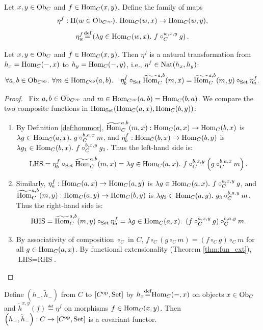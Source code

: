 \documentclass[10pt,a4paper]{article}
\renewcommand{\myprf}{\begin{proof}}
\renewcommand{\myqed}{\end{proof}}
\begin{document}
\begin{definition}
Let $x, y \in {\textrm{Ob}}_C$ and $f \in {\textrm{Hom}}_C(x,y)$. Define the family of maps
$$\eta^f : \Pi(w\in \Ob_{C^\op}).\ \Hom_C(w,x)\to \Hom_C(w,y),$$
$$\eta^f_w \eqdef \left(\lambda g\in\Hom_C(w,x).\ f\circ_C^{w,x,y} g\right).$$
\end{definition}

\begin{lemma}\label{lem:eta_nat}
Let $x,y \in {\textrm{Ob}}_C$ and $f \in {\textrm{Hom}}_C(x,y)$. Then $\eta^f$ is a natural transformation from $h_x = {\textrm{Hom}}_C(-,x)$ to $h_y = {\textrm{Hom}}_C(-,y)$, i.e., $\eta^f \in {\textrm{Nat}}(h_x, h_y)$:
$$\forall a,b\in {\textrm{Ob}}_{C^{\textrm{op}}}.\ \forall m\in {\textrm{Hom}}_{C^{\textrm{op}}}(a,b).\quad \eta^f_b \circ_{\textrm{Set}} {\widetilde{{\textrm{Hom}}}\textrm{}}_C^{a,b}(m,x) = {\widetilde{{\textrm{Hom}}}\textrm{}}_C^{a,b}(m,y)\circ_{\textrm{Set}}\eta^f_a.$$
\end{lemma}
\myprf\ Fix $a, b \in {\textrm{Ob}}_{C^{\textrm{op}}}$ and $m \in {\textrm{Hom}}_{C^{\textrm{op}}}(a,b) = {\textrm{Hom}}_C(b,a)$. We compare the two composite functions in ${\textrm{Hom}}_{\textrm{Set}}({\textrm{Hom}}_C(a,x), {\textrm{Hom}}_C(b,y))$:
\begin{enumerate}
\item By Definition \ref{def:hommor}, ${\widetilde{{\textrm{Hom}}}\textrm{}}_C^{a,b}(m,x) : {\textrm{Hom}}_C(a,x) \to {\textrm{Hom}}_C(b,x)$ is $\lambda g \in {\textrm{Hom}}_C(a,x).\ g \circ_C^{b,a,x} m$, and $\eta^f_b : {\textrm{Hom}}_C(b,x) \to {\textrm{Hom}}_C(b,y)$ is $\lambda g_1 \in {\textrm{Hom}}_C(b,x).\ f \circ_C^{b,x,y} g_1$. Thus the left-hand side is:
$$\textrm{LHS} = \eta^f_b \circ_{\textrm{Set}} {\widetilde{{\textrm{Hom}}}\textrm{}}_C^{a,b}(m,x) = \lambda g \in {\textrm{Hom}}_C(a,x).\ f \circ_C^{b,x,y} \left(g \circ_C^{b,a,x} m\right).$$
\item Similarly, $\eta^f_a : {\textrm{Hom}}_C(a,x) \to {\textrm{Hom}}_C(a,y)$ is $\lambda g \in {\textrm{Hom}}_C(a,x).\ f \circ_C^{a,x,y} g$, and ${\widetilde{{\textrm{Hom}}}\textrm{}}_C^{a,b}(m,y) : {\textrm{Hom}}_C(a,y) \to {\textrm{Hom}}_C(b,y)$ is $\lambda g_3 \in {\textrm{Hom}}_C(a,y).\ g_3 \circ_C^{b,a,y} m$. Thus the right-hand side is:
$$\textrm{RHS} = {\widetilde{{\textrm{Hom}}}\textrm{}}_C^{a,b}(m,y) \circ_{\textrm{Set}} \eta^f_a = \lambda g \in {\textrm{Hom}}_C(a,x).\ \left(f \circ_C^{a,x,y} g\right) \circ_C^{b,a,y} m.$$
\item By associativity of composition $\circ_C$ in $C$, $f \circ_C (g \circ_C m) = (f \circ_C g) \circ_C m$ for all $g \in {\textrm{Hom}}_C(a,x)$. By functional extensionality (Theorem \ref{thm:fun_ext}), $\textrm{LHS} = \textrm{RHS}$.
\end{enumerate}
\myqed
\begin{lemma}\label{lem:yoneda_functor}
Define $\left(h_-, \widetilde{h}_-\right)$ from $C$ to $[C^{\textrm{op}}, {\textrm{Set}}]$ by $h_x {\stackrel{{\textrm{def}}}{=}} {\textrm{Hom}}_C(-,x)$ on objects $x \in {\textrm{Ob}}_C$ and $\widetilde{h}^{x,y}(f) \eqdef \eta^f$ on morphisms $f \in {\textrm{Hom}}_C(x,y)$. Then $\left(h_-, \widetilde{h}_-\right) : C \to [C^{\textrm{op}}, {\textrm{Set}}]$ is a covariant functor.
\end{lemma}
\end{document}
